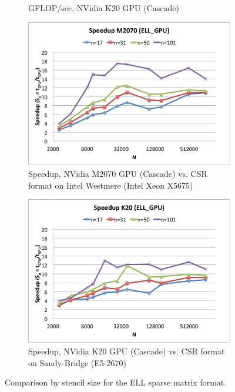\documentclass{report}
\begin{document}
\begin{figure}
\begin{subfigure}[t]{0.48\textwidth}
\caption{GFLOP/sec, NVidia K20 GPU (Cascade)}
\label{fig:ell_gflops_cascade_k20}
\end{subfigure}
\begin{subfigure}[t]{0.48\textwidth}
\centering
\includegraphics[width=\textwidth]{gpu_content/cascade_spmv/ell_comparison_speedup_cascade_m2070.png}
\caption{Speedup, NVidia M2070 GPU (Cascade) vs. CSR format on Intel Westmere (Intel Xeon X5675)}
\label{fig:ell_speedup_cascade_m2070}
\end{subfigure}
\quad
\begin{subfigure}[t]{0.48\textwidth}
\centering
\includegraphics[width=\textwidth]{gpu_content/cascade_spmv/ell_comparison_speedup_cascade_k20.png}
\caption{Speedup, NVidia K20 GPU (Cascade) vs. CSR format on Sandy-Bridge (E5-2670)}
\label{fig:ell_speedup_cascade_k20}
\end{subfigure}
\caption{Comparison by stencil size for the ELL sparse matrix format.}
\end{figure}
\end{document}
